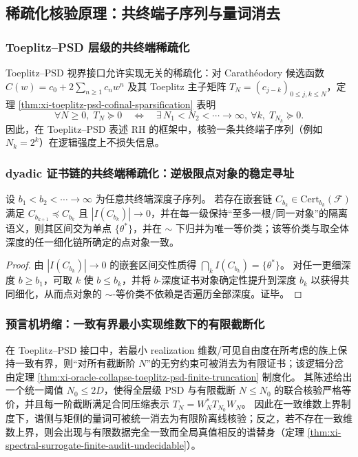 \subsection{稀疏化核验原理：共终端子序列与量词消去}\label{subsec:cdim-sparsification-oracle-collapse}
\subsubsection{Toeplitz--PSD 层级的共终端稀疏化}
Toeplitz--PSD 视界接口允许实现无关的稀疏化：对 Carath\'eodory 候选函数 \(C(w)=c_0+2\sum_{n\ge 1}c_n w^n\) 及其 Toeplitz 主子矩阵 \(T_N=(c_{j-k})_{0\le j,k\le N}\)，定理 \ref{thm:xi-toeplitz-psd-cofinal-sparsification} 表明
\[
\forall N\ge 0,\;T_N\succeq 0
\quad\Longleftrightarrow\quad
\exists\,N_1<N_2<\cdots\to\infty,\ \forall k,\;T_{N_k}\succeq 0.
\]
因此，在 Toeplitz--PSD 表述 RH 的框架中，核验一条共终端子序列（例如 \(N_k=2^k\)）在逻辑强度上不损失信息。

\subsubsection{dyadic 证书链的共终端稀疏化：逆极限点对象的稳定寻址}
\begin{proposition}[共终端深度子链的逆极限不变性]\label{prop:cdim-dyadic-cofinal-sparsification}
设 \(b_1<b_2<\cdots\to\infty\) 为任意共终端深度子序列。
若存在嵌套链 \(C_{b_k}\in\mathrm{Cert}_{b_k}(\mathcal F)\) 满足 \(C_{b_{k+1}}\preceq C_{b_k}\) 且 \(|I(C_{b_k})|\to 0\)，并在每一级保持“至多一根/同一对象”的隔离语义，则其区间交为单点 \(\{\theta^\ast\}\)，并在 \(\sim\) 下归并为唯一等价类；该等价类与取全体深度的任一细化链所确定的点对象一致。
\end{proposition}
\begin{proof}
由 \(|I(C_{b_k})|\to 0\) 的嵌套区间交性质得 \(\bigcap_k I(C_{b_k})=\{\theta^\ast\}\)。
对任一更细深度 \(b\ge b_1\)，可取 \(k\) 使 \(b\le b_k\)，并将 \(b\)-深度证书对象确定性提升到深度 \(b_k\) 以获得共同细化，从而点对象的 \(\sim\)-等价类不依赖是否遍历全部深度。证毕。
\end{proof}

\subsubsection{预言机坍缩：一致有界最小实现维数下的有限截断化}
在 Toeplitz--PSD 接口中，若最小 realization 维数/可见自由度在所考虑的族上保持一致有界，则“对所有截断阶 \(N\)”的无穷约束可被消去为有限证书；该逻辑分岔由定理 \ref{thm:xi-oracle-collapse-toeplitz-psd-finite-truncation} 制度化。
其陈述给出一个统一阈值 \(N_0\le 2D\)，使得全层级 PSD 与有限截断 \(N\le N_0\) 的联合核验严格等价，并且每一阶截断满足合同压缩表示 \(T_N=W_N^\ast T_{N_0}W_N\)。
因此在一致维数上界制度下，谱侧与矩侧的量词可被统一消去为有限阶离线核验；反之，若不存在一致维数上界，则会出现与有限数据完全一致而全局真值相反的谱替身（定理 \ref{thm:xi-spectral-surrogate-finite-audit-undecidable}）。

